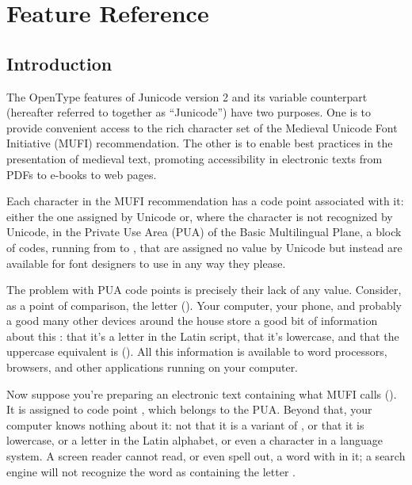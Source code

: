 
\chapter{Feature Reference}\hypertarget{FeatureReference}{}

\section{Introduction}
The OpenType features of Junicode version 2 and its variable counterpart (hereafter referred to together as
``Junicode'') have two purposes. One is to provide convenient access to the rich character set of the Medieval Unicode
Font Initiative (MUFI) recommendation. The other is to enable best practices in the presentation of medieval text,
promoting accessibility in electronic texts from PDFs to e-books to web pages.

Each character in the MUFI recommendation has a code point associated with it: either the one
assigned by Unicode or, where the character is not recognized by Unicode, in the Private Use Area (PUA) of the Basic
Multilingual Plane, a block of codes, running from  to , that are assigned no value by Unicode but instead
are available for font designers to use in any way they please.

The problem with PUA code points is precisely their lack of any value. Consider, as a point of comparison, the letter
 (). Your computer, your phone, and probably a good many other devices around the house
store a good bit of information about this : that it’s a letter in the Latin script, that
it’s lowercase, and that the uppercase equivalent is  (). All this information is
available to word processors, browsers, and other applications running on your computer.

Now suppose you're preparing an electronic text containing what MUFI calls  (). It is assigned to code point , which belongs to the PUA. Beyond that, your
computer knows nothing about it: not that it is a variant of , or that it is lowercase, or a letter in the Latin
alphabet, or even a character in a language system. A screen reader cannot read, or even spell out, a word with 
in it; a search engine will not recognize the word as containing the letter .


